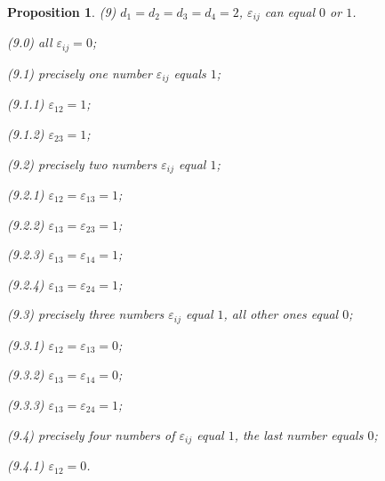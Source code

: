 \documentclass[14pt]{article}
\newtheorem{proposition}{\indent Proposition}[section]
\begin{document}
\begin{proposition}
(9) $d_1 = d_2 = d_3 = d_4 = 2$, $\varepsilon_{ij}$ can  equal $0$ or $1$.

\hskip 0.5cm (9.0) all $\varepsilon_{ij} = 0$;

\hskip 0.5cm (9.1) precisely one number $\varepsilon_{ij}$ equals $1$;

\hskip 1cm (9.1.1)  $\varepsilon_{12} = 1$;

\hskip 1cm (9.1.2)  $\varepsilon_{23} = 1$;

\hskip 0.5cm (9.2) precisely two numbers  $\varepsilon_{ij}$ equal $1$;

\hskip 1cm (9.2.1)  $\varepsilon_{12} = \varepsilon_{13} = 1$;

\hskip 1cm (9.2.2)  $\varepsilon_{13} = \varepsilon_{23} = 1$;

\hskip 1cm (9.2.3)  $\varepsilon_{13} = \varepsilon_{14} = 1$;

\hskip 1cm (9.2.4)  $\varepsilon_{13} = \varepsilon_{24} = 1$;

\hskip 0.5cm (9.3) precisely three numbers $\varepsilon_{ij}$ equal $1$,
all other ones equal $0$;

\hskip 1cm (9.3.1)  $\varepsilon_{12} = \varepsilon_{13} = 0$;

\hskip 1cm (9.3.2)  $\varepsilon_{13} = \varepsilon_{14} = 0$;

\hskip 1cm (9.3.3)  $\varepsilon_{13} = \varepsilon_{24} = 1$;


\hskip 0.5cm (9.4) precisely four numbers of $\varepsilon_{ij}$ equal $1$,
the last number equals $0$;

\hskip 1cm (9.4.1)  $\varepsilon_{12} = 0$.

\end{proposition}
\end{document}
